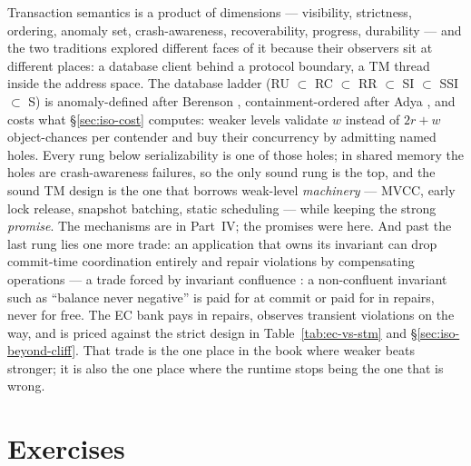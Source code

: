 Transaction semantics is a product of dimensions --- visibility, strictness,
ordering, anomaly set, crash-awareness, recoverability, progress, durability
--- and the two traditions explored different faces of it because their
observers sit at different places: a database client behind a protocol
boundary, a TM thread inside the address space. The database ladder
(RU $\subset$ RC $\subset$ RR $\subset$ SI $\subset$ SSI $\subset$ S) is
anomaly-defined after Berenson \cite{berenson95critique}, containment-ordered
after Adya \cite{adya99thesis}, and costs what \S\ref{sec:iso-cost} computes:
weaker levels validate $w$ instead of $2r+w$ object-chances per contender and
buy their concurrency by admitting named holes. Every rung below
serializability is one of those holes; in shared memory the holes are
crash-awareness failures, so the only sound rung is the top, and the sound
TM design is the one that borrows weak-level \emph{machinery} --- MVCC, early
lock release, snapshot batching, static scheduling --- while keeping the
strong \emph{promise}. The mechanisms are in Part~IV; the promises were
here. And past the last rung lies one more trade: an application that owns
its invariant can drop commit-time coordination entirely and repair
violations by compensating operations --- a trade forced by invariant
confluence \cite{bailis14confluence}: a non-confluent invariant such as
``balance never negative'' is paid for at commit or paid for in repairs,
never for free. The EC bank pays in repairs, observes transient violations
on the way, and is priced against the strict design in
Table~\ref{tab:ec-vs-stm} and \S\ref{sec:iso-beyond-cliff}. That trade is
the one place in the book where weaker beats stronger; it is also the one
place where the runtime stops being the one that is wrong.
\section{Exercises}


